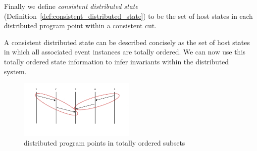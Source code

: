 
Finally we define \textit{consistent distributed state}
(Definition~\ref{def:consistent_distributed_state}) to be the set of
host states in each distributed program point within a consistent cut.

A consistent distributed state can be described concisely as the set of
host states in which all associated event instances are totally ordered. 
We can now use this totally ordered state information to infer invariants
within the distributed system.


\begin{figure}[h]
    \includegraphics[width=0.5\textwidth]{fig/cut-total-ordering-partial}
  \caption{distributed program points in totally ordered subsets}
\end{figure}

